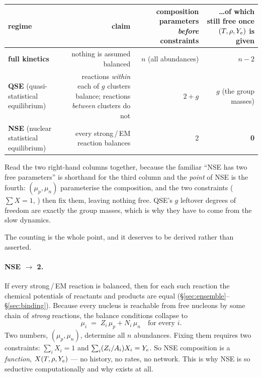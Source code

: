 \begin{center}
\begin{tabularx}{\textwidth}{@{}L{2.5cm} R{1.25} R{0.95} R{0.8}@{}}
\toprule
\textbf{regime} & \textbf{claim} & \textbf{composition parameters
  \emph{before} constraints} & \textbf{\ldots of which still free once
  $(T, \rho, Y_{e})$ is given} \\
\midrule
\textbf{full kinetics} & nothing is assumed balanced &
  $n$ (all abundances) & $n - 2$ \\
\textbf{QSE} (quasi-statistical equilibrium) &
  reactions \emph{within} each of $g$ clusters balance; reactions
  \emph{between} clusters do not & $2 + g$ &
  \textbf{$g$} (the group masses) \\
\textbf{NSE} (nuclear statistical equilibrium) &
  every strong\,/\,EM reaction balances & 2 & \textbf{0} \\
\bottomrule
\end{tabularx}
\end{center}

Read the two right-hand columns together, because the familiar ``NSE has two
free parameters'' is shorthand for the third column and the \emph{point} of NSE
is the fourth: $(\mu_p, \mu_n)$ parameterise the composition, and the two
constraints ($\sum X = 1$, \Ye) then fix them, leaving nothing free. QSE's $g$
leftover degrees of freedom are exactly the group masses, which is why they have
to come from the slow dynamics.

The counting is the whole point, and it deserves to be derived rather than
asserted.

\paragraph{NSE $\to$ 2.} If every strong\,/\,EM reaction is balanced, then for
each such reaction the chemical potentials of reactants and products are equal
(\S\ref{sec:ensemble}--\S\ref{sec:binding}). Because every nucleus is reachable
from free nucleons by some chain of \emph{strong} reactions, the balance
conditions collapse to
%
\begin{equation}
\mu_i \;=\; Z_i\,\mu_p + N_i\,\mu_n \quad\text{for every } i.
\label{eq:nsemu}
\end{equation}
%
Two numbers, $(\mu_p, \mu_n)$, determine all $n$ abundances. Fixing them
requires two constraints: $\sum_i X_i = 1$ and $\sum_i (Z_i/A_i)X_i = Y_{e}$. So
NSE composition is a \emph{function}, $X(T, \rho, Y_{e})$ --- no history, no
rates, no network. This is why NSE is so seductive computationally and why
 exists at all.

